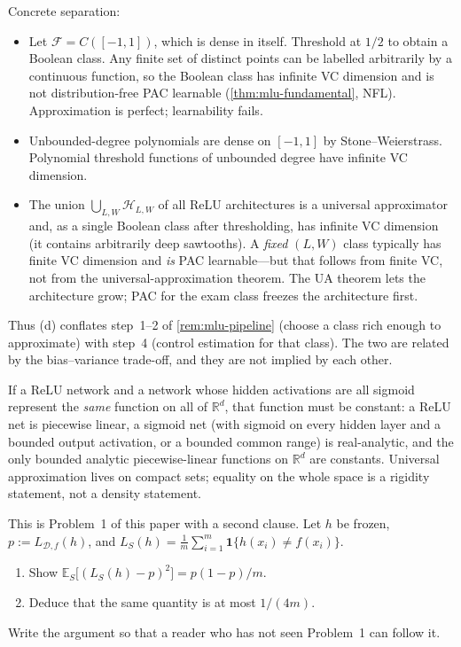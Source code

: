 \begin{solution}
Concrete separation:
\begin{itemize}
    \item Let $\mathcal{F}=C([-1,1])$, which is dense in itself. Threshold at $1/2$ to obtain a Boolean class. Any finite set of distinct points can be labelled arbitrarily by a continuous function, so the Boolean class has infinite VC dimension and is not distribution-free PAC learnable (\cref{thm:mlu-fundamental}, NFL). Approximation is perfect; learnability fails.
    \item Unbounded-degree polynomials are dense on $[-1,1]$ by Stone--Weierstrass. Polynomial threshold functions of unbounded degree have infinite VC dimension.
    \item The union $\bigcup_{L,W}\mathcal{H}_{L,W}$ of all ReLU architectures is a universal approximator and, as a single Boolean class after thresholding, has infinite VC dimension (it contains arbitrarily deep sawtooths). A \emph{fixed} $(L,W)$ class typically has finite VC dimension and \emph{is} PAC learnable---but that follows from finite VC, not from the universal-approximation theorem. The UA theorem lets the architecture grow; PAC for the exam class freezes the architecture first.
\end{itemize}
Thus (d) conflates step~1--2 of \cref{rem:mlu-pipeline} (choose a class rich enough to approximate) with step~4 (control estimation for that class). The two are related by the bias--variance trade-off, and they are not implied by each other.
\end{solution}

\begin{remark}
If a ReLU network and a network whose hidden activations are all sigmoid represent the \emph{same} function on all of $\mathbb{R}^d$, that function must be constant: a ReLU net is piecewise linear, a sigmoid net (with sigmoid on every hidden layer and a bounded output activation, or a bounded common range) is real-analytic, and the only bounded analytic piecewise-linear functions on $\mathbb{R}^d$ are constants. Universal approximation lives on compact sets; equality on the whole space is a rigidity statement, not a density statement.
\end{remark}

\begin{exercise}
\label{ex:mlu-mse}
This is Problem~1 of this paper with a second clause. Let $h$ be frozen, $p:=L_{\mathcal{D},f}(h)$, and $L_S(h)=\frac1m\sum_{i=1}^m\mathbf{1}\{h(x_i)\ne f(x_i)\}$.
\begin{enumerate}[label=(\alph*)]
    \item Show $\mathbb{E}_S\bigl[(L_S(h)-p)^2\bigr]=p(1-p)/m$.
    \item Deduce that the same quantity is at most $1/(4m)$.
\end{enumerate}
Write the argument so that a reader who has not seen Problem~1 can follow it.
\end{exercise}

